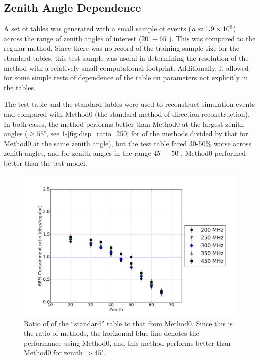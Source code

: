 \documentclass[main.tex]{subfiles}
\begin{document}
\subsection{Zenith Angle Dependence}
A set of \disp tables was generated with a small sample of events ($n\approx 1.9\times 10^{6}$) across the range of zenith angles of interest ($20^\circ-65^\circ$). This was compared to the regular \disp method. Since there was no record of the training sample size for the standard tables, this test sample was useful in determining the resolution of the \disp method with a relatively small computational footprint. Additionally, it allowed for some simple tests of dependence of the \disp table on parameters not explicitly in the \disp tables.

The test \disp table and the standard \disp tables were used to reconstruct simulation events and compared with Method0 (the standard method of direction reconstruction). In both cases, the \disp method performs better than Method0 at the largest zenith angles ($\geq 55^\circ$, see \ref{fig:olddisp_ratio}-\ref{fig:disp_ratio_250} for \rse of the \disp methods divided by that for Method0 at the same zenith angle), but the test \disp table fared 30-50\% worse across zenith angles, and for zenith angles in the range $45^\circ-50^\circ$, Method0 performed better than the test model. 

\begin{figure}[htbp]
  \begin{center}
      \includegraphics[width=0.75\linewidth]{images/disp_standard_ratio_xzen}
      \caption[``standard'' \disp table reconstruction.]{Ratio of \rse of the ``standard'' \disp table to that from Method0. Since this is the ratio of methods, the horizontal blue line denotes the performance using Method0, and this method performs better than Method0 for zenith $>45^\circ$.}  
      \label{fig:olddisp_ratio}
  \end{center}
\end{figure}
\end{document}
